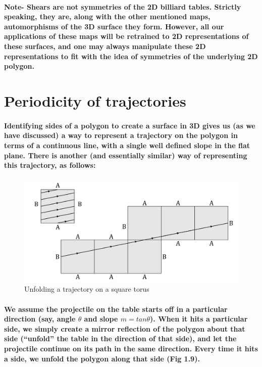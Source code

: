 \documentclass{report}
\begin{document}
\paragraph{Note- Shears are not symmetries of the 2D billiard tables. Strictly speaking, they are, along with the other mentioned maps, automorphisms of the 3D surface they form. However, all our applications of these maps will be retrained to 2D representations of these surfaces, and one may always manipulate these 2D representations to fit with the idea of symmetries of the underlying 2D polygon.  }


\section{Periodicity of trajectories}

\paragraph{Identifying sides of a polygon to create a surface in 3D gives us (as we have discussed) a way to represent a trajectory on the polygon in terms of a continuous line, with a single well defined slope in the flat plane. There is another (and essentially similar) way of representing this trajectory, as follows:}

\pagebreak

\begin{figure} 
\begin{center}
\includegraphics[scale=0.3]{9}
\caption{Unfolding a trajectory on a square torus}
\end{center}
\end{figure}

\paragraph{We assume the projectile on the table starts off in a particular direction (say, angle $\theta$ and slope $m = tan\theta$). When it hits a particular side, we simply create a mirror reflection of the polygon about that side (“unfold” the table in the direction of that side), and let the projectile continue on its path in the same direction. Every time it hits a side, we unfold the polygon along that side (Fig 1.9).}
\end{document}
